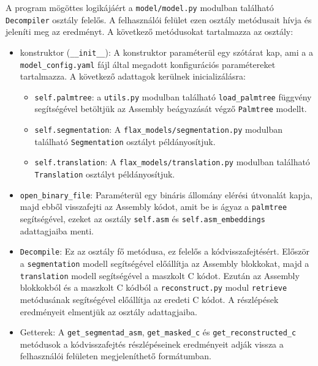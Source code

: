     A program mögöttes logikájáért a \texttt{model/model.py} modulban található \texttt{Decompiler}
    osztály felelős. A felhasználói felület ezen osztály metódusait hívja és jeleníti meg az eredményt.
    A következő metódusokat tartalmazza az osztály:
    \begin{itemize}
        \item konstruktor (\texttt{\_\_init\_\_}): A konstruktor paraméterül egy szótárat kap, ami a
            a \texttt{model\_config.yaml} fájl által megadott konfigurációs paramétereket tartalmazza.
            A következő adattagok kerülnek inicializálásra:
            \begin{itemize}
                \item \texttt{self.palmtree}: a \texttt{utils.py} modulban található \texttt{load\_palmtree}
                    függvény segítségével betöltjük az Assembly beágyazását végző \texttt{Palmtree} modellt.
                \item \texttt{self.segmentation}: A \texttt{flax\_models/segmentation.py} modulban található
                    \texttt{Segmentation} osztályt példányosítjuk.
                \item \texttt{self.translation}: A \texttt{flax\_models/translation.py} modulban található
                \texttt{Translation} osztályt példányosítjuk.
            \end{itemize}
        \item \texttt{open\_binary\_file}: Paraméterül egy bináris állomány elérési útvonalát kapja, majd
            ebből visszafejti az Assembly kódot, amit be is ágyaz a \texttt{palmtree} segítségével, ezeket
            az osztály \texttt{self.asm} és \texttt{self.asm\_embeddings} adattagjaiba menti.
        \item \texttt{Decompile}: Ez az osztály fő metódusa, ez felelős a kódvisszafejtésért.
            Először a \texttt{segmentation} modell segítségével előállítja az Assembly blokkokat,
            majd a \texttt{translation} modell segítségével a maszkolt C kódot. Ezután az Assembly blokkokból
            és a maszkolt C kódból a \texttt{reconstruct.py} modul \texttt{retrieve} metódusának segítségével
            előállítja az eredeti C kódot. A részlépések eredményeit elmentjük az osztály adattagjaiba.
        \item Getterek: A \texttt{get\_segmentad\_asm}, \texttt{get\_masked\_c} és \texttt{get\_reconstructed\_c}
            metódusok a kódvisszafejtés részlépéseinek eredményeit adják vissza a felhasználói felületen
            megjeleníthető formátumban.
    \end{itemize}

